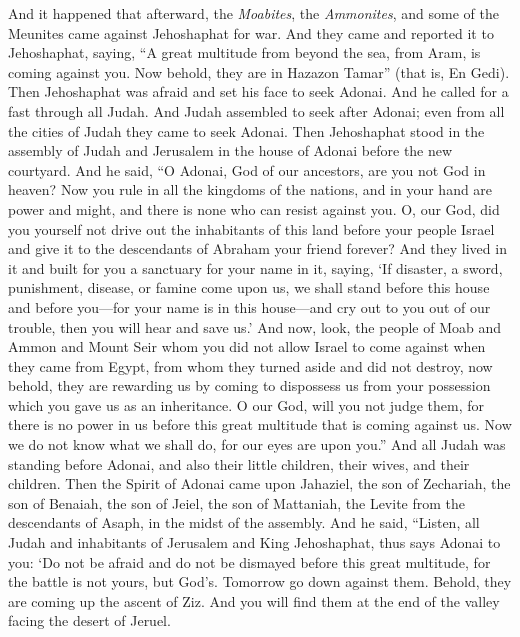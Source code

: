 \begin{biblechapter} %
 And it happened that afterward, the \textit{Moabites}, the \textit{Ammonites}, and some of the Meunites came against Jehoshaphat for war.
\verse And they came and reported it to Jehoshaphat, saying, “A great multitude from beyond the sea, from Aram, is coming against you. Now behold, they are in Hazazon Tamar” (that is, En Gedi).
\verse Then Jehoshaphat was afraid and set his face to seek Adonai. And he called for a fast through all Judah.
\verse And Judah assembled to seek after Adonai; even from all the cities of Judah they came to seek Adonai.
\verse Then Jehoshaphat stood in the assembly of Judah and Jerusalem in the house of Adonai before the new courtyard.
\verse And he said, “O Adonai, God of our ancestors, are you not God in heaven? Now you rule in all the kingdoms of the nations, and in your hand are power and might, and there is none who can resist against you.
\verse O, our God, did you yourself not drive out the inhabitants of this land before your people Israel and give it to the descendants of Abraham your friend forever?
\verse And they lived in it and built for you a sanctuary for your name in it, saying,
\verse ‘If disaster, a sword, punishment, disease, or famine come upon us, we shall stand before this house and before you—for your name is in this house—and cry out to you out of our trouble, then you will hear and save us.’
\verse And now, look, the people of Moab and Ammon and Mount Seir whom you did not allow Israel to come against when they came from Egypt, from whom they turned aside and did not destroy,
\verse now behold, they are rewarding us by coming to dispossess us from your possession which you gave us as an inheritance.
\verse O our God, will you not judge them, for there is no power in us before this great multitude that is coming against us. Now we do not know what we shall do, for our eyes are upon you.”
\verse And all Judah was standing before Adonai, and also their little children, their wives, and their children.
\verse Then the Spirit of Adonai came upon Jahaziel, the son of Zechariah, the son of Benaiah, the son of Jeiel, the son of Mattaniah, the Levite from the descendants of Asaph, in the midst of the assembly.
\verse And he said, “Listen, all Judah and inhabitants of Jerusalem and King Jehoshaphat, thus says Adonai to you: ‘Do not be afraid and do not be dismayed before this great multitude, for the battle is not yours, but God’s.
\verse Tomorrow go down against them. Behold, they are coming up the ascent of Ziz. And you will find them at the end of the valley facing the desert of Jeruel.

\end{biblechapter}
